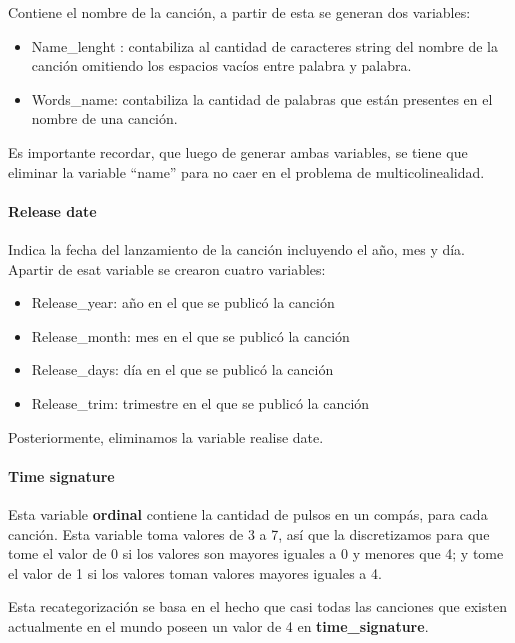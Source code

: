 \documentclass[
  letterpaper,
  DIV=11,
  numbers=noendperiod]{scrartcl}
\providecommand{\tightlist}{%
  \setlength{\itemsep}{0pt}\setlength{\parskip}{0pt}}
\let\oldparagraph\paragraph
\renewcommand{\paragraph}[1]{\oldparagraph{#1}\mbox{}}
\begin{document}
Contiene el nombre de la canción, a partir de esta se generan dos
variables:

\begin{itemize}
\tightlist
\item
  Name\_lenght : contabiliza al cantidad de caracteres string del nombre
  de la canción omitiendo los espacios vacíos entre palabra y palabra.
\item
  Words\_name: contabiliza la cantidad de palabras que están presentes
  en el nombre de una canción.
\end{itemize}

Es importante recordar, que luego de generar ambas variables, se tiene
que eliminar la variable ``name'' para no caer en el problema de
multicolinealidad.

\hypertarget{release-date}{%
\paragraph{Release date}\label{release-date}}

Indica la fecha del lanzamiento de la canción incluyendo el año, mes y
día. Apartir de esat variable se crearon cuatro variables:

\begin{itemize}
\tightlist
\item
  Release\_year: año en el que se publicó la canción
\item
  Release\_month: mes en el que se publicó la canción
\item
  Release\_days: día en el que se publicó la canción
\item
  Release\_trim: trimestre en el que se publicó la canción
\end{itemize}

Posteriormente, eliminamos la variable realise date.

\hypertarget{time-signature}{%
\paragraph{Time signature}\label{time-signature}}

Esta variable \textbf{ordinal} contiene la cantidad de pulsos en un
compás, para cada canción. Esta variable toma valores de 3 a 7, así que
la discretizamos para que tome el valor de 0 si los valores son mayores
iguales a 0 y menores que 4; y tome el valor de 1 si los valores toman
valores mayores iguales a 4.

Esta recategorización se basa en el hecho que casi todas las canciones
que existen actualmente en el mundo poseen un valor de 4 en
\textbf{time\_signature}.
\end{document}
